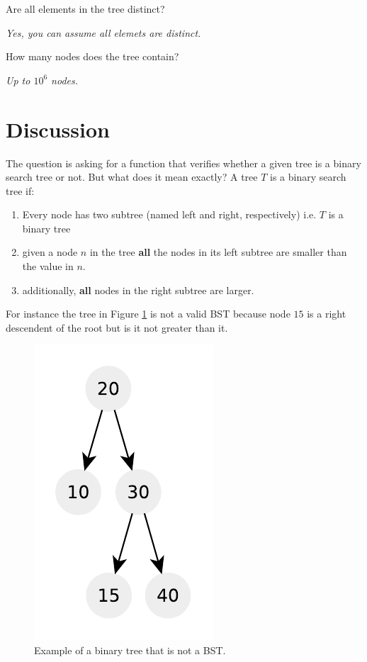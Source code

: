 \begin{QandA}
	\item Are all elements in the tree distinct?
	\begin{answered}
		\textit{Yes, you can assume all elemets are distinct.}
	\end{answered}
	\item How many nodes does the tree contain?
	\begin{answered}
		\textit{Up to $10^6$ nodes.}
	\end{answered}
\end{QandA}

\section{Discussion}
\label{verify_BST:sec:discussion}
The question is asking for a function that verifies whether a given tree is a binary search tree or not. But what does it mean exactly?
A tree $T$ is a binary search tree if:
\begin{enumerate}
	\item Every node has two subtree (named left and right, respectively) i.e. $T$ is a binary tree
	\item given a node $n$ in the tree \textbf{all} the nodes in its left subtree are smaller than the value in $n$.
	\item additionally,  \textbf{all} nodes in the right subtree are larger.
\end{enumerate}
For instance the tree in Figure \ref{ex:verify_BST:no_BST} is not a valid BST because node $15$ is a right descendent of the root but is it not greater than it. 

\begin{figure}
	\centering
	\includegraphics[width=0.3\linewidth]{sources/verify_BST/images/no_BST}
	\caption{Example of a binary tree that is not a BST.}
	\label{ex:verify_BST:no_BST}
\end{figure}



